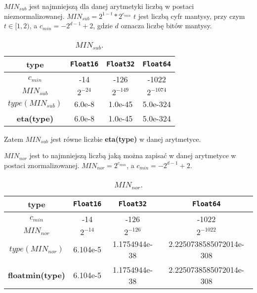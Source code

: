 \documentclass{article}
\begin{document}
\begin{center}
    \large \(MIN_{sub}\) jest najmniejszą dla danej arytmetyki liczbą w postaci nieznormalizowanej. \newline
    \(\displaystyle MIN_{sub} = 2^{1-t}*2^{c_{min}}\)
    \(t\) jest liczbą cyfr mantysy, przy czym \(t \in [1,2)\), \newline a \(c_{min} = -2^{d-1} + 2\), gdzie \(d\) oznacza liczbę bitów mantysy.
    \begin{table}[h!]
    \centering
    \begin{tabular}{||c c c c||} 
    \hline
    \textbf{type} & \texttt{Float16} & \texttt{Float32} & \texttt{Float64} \\ [0.5ex]
    \hline\hline
    \textbf{\(c_{min}\)} & -14 & -126 & -1022  \\ 
    \textbf{\(MIN_{sub}\)} & \(2^{-24}\) & \(2^{-149}\) & \(2^{-1074}\) \\
    \textbf{\(type(MIN_{sub})\)} & 6.0e-8 & 1.0e-45 & 5.0e-324 \\
    \textbf{eta(type)} & 6.0e-8 & 1.0e-45 & 5.0e-324 \\
    \hline
    \end{tabular}
    \caption{\(MIN_{sub}\).}
    \label{table:3}
    \end{table}
    
    \large Zatem \(MIN_{sub}\) jest równe liczbie \textbf{eta(type)} w danej arytmetyce. \newline

    \(MIN_{nor}\) jest to najmniejszą liczbą jaką można zapisać w danej arytmetyce w postaci znormalizowanej. \newline
    \(MIN_{nor} = 2^{c_{min}}\), a \(c_{min} = -2^{d-1} + 2\).
    \begin{table}[h!]
    \centering
    \begin{tabular}{||c c c c||} 
    \hline
    \textbf{type} & \texttt{Float16} & \texttt{Float32} & \texttt{Float64} \\ [0.5ex]
    \hline\hline
    \textbf{\(c_{min}\)} & -14 & -126 & -1022  \\ 
    \textbf{\(MIN_{nor}\)} & \(2^{-14}\) & \(2^{-126}\) & \(2^{-1022}\) \\
    \textbf{\(type(MIN_{nor})\)} & 6.104e-5 & 1.1754944e-38 & 2.2250738585072014e-308 \\
    \textbf{floatmin(type)} & 6.104e-5 & 1.1754944e-38 & 2.2250738585072014e-308 \\
    \hline
    \end{tabular}
    \caption{\(MIN_{nor}\).}
    \label{table:3}
    \end{table}


\end{center}
\end{document}
